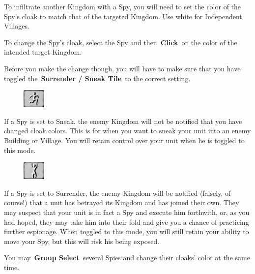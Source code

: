To infiltrate another Kingdom with a Spy, you will need to set the color of the Spy’s cloak to match that of the targeted Kingdom. Use white for Independent Villages.

To change the Spy’s cloak, select the Spy and then \textbf{Click} on the color of the intended target Kingdom.

Before you make the change though, you will have to make sure that you have toggled the \textbf{Surrender / Sneak Tile} to the correct setting.

\begin{figure}
	\vspace{-20pt}
	\begin{center}
		\includegraphics[width=0.1\textwidth]{Tsneak}
	\end{center}
	\vspace{-20pt}
\end{figure}

If a Spy is set to Sneak, the enemy Kingdom will not be notified that you have changed cloak colors. This is for when you want to sneak your unit into an enemy Building or Village. You will retain control over your unit when he is toggled to this mode.

\begin{figure}
	\vspace{-20pt}
	\begin{center}
		\includegraphics[width=0.1\textwidth]{Treveal}
	\end{center}
	\vspace{-20pt}
\end{figure}

If a Spy is set to Surrender, the enemy Kingdom will be notified (falsely, of course!) that a unit has betrayed its Kingdom and has joined their own. They may suspect that your unit is in fact a Spy and execute him forthwith, or, as you had hoped, they may take him into their fold and give you a chance of practicing further espionage. When toggled to this mode, you will still retain your ability to move your Spy, but this will risk his being exposed.

You may \textbf{Group Select} several Spies and change their cloaks’ color at the same time.

